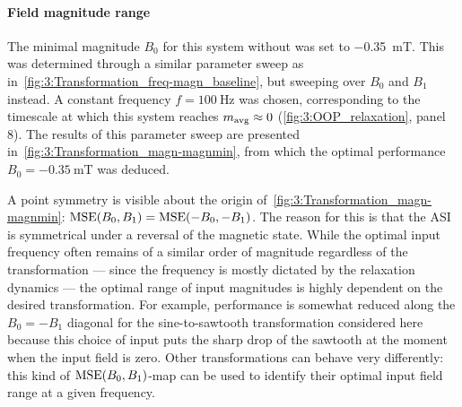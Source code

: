 \paragraph{Field magnitude range}
The minimal  magnitude $B_0$ for this system without  was set to \SI{-0.35}{\milli\tesla}.
This was determined through a similar parameter sweep as in~\cref{fig:3:Transformation_freq-magn_baseline}, but sweeping over $B_0$ and $B_1$ instead.
A constant frequency $f=\SI{100}{\hertz}$ was chosen, corresponding to the timescale at which this system reaches $m_\mathrm{avg} \approx 0$ (\cref{fig:3:OOP_relaxation}, panel 8).
The results of this parameter sweep are presented in~\cref{fig:3:Transformation_magn-magnmin}, from which the optimal performance $B_0=\SI{-0.35}{\milli\tesla}$ was deduced.

\vspace{-1em}

A point symmetry is visible about the origin of~\cref{fig:3:Transformation_magn-magnmin}: $\mathrm{MSE}(B_0, B_1) = \mathrm{MSE}(-B_0, -B_1)$.
The reason for this is that the ASI is symmetrical under a reversal of the magnetic state.
While the optimal input frequency often remains of a similar order of magnitude regardless of the transformation --- since the frequency is mostly dictated by the relaxation dynamics --- the optimal range of input  magnitudes is highly dependent on the desired transformation.
For example, performance is somewhat reduced along the $B_0 = -B_1$ diagonal for the sine-to-sawtooth transformation considered here because this choice of input puts the sharp drop of the sawtooth at the moment when the input field is zero.
Other transformations can behave very differently: this kind of $\mathrm{MSE}(B_0, B_1)$-map can be used to identify their optimal input field range at a given frequency.

